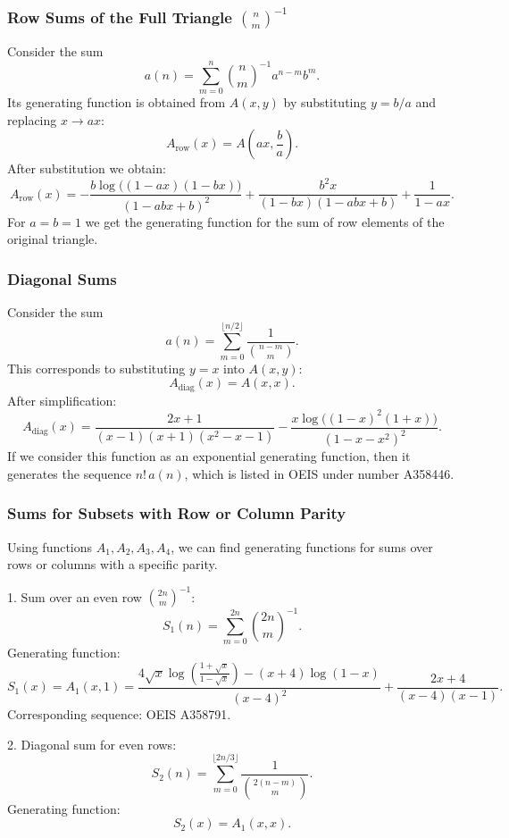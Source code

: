 \documentclass[12pt]{article}
\begin{document}
\subsubsection{Row Sums of the Full Triangle \( \binom{n}{m}^{-1} \)}\label{LS9}

Consider the sum
\[
a(n) = \sum_{m=0}^{n} \binom{n}{m}^{-1} a^{n-m} b^m.
\]
Its generating function is obtained from \( A(x,y) \) by substituting \( y = b/a \) and replacing \( x \to a x \):
\[
A_{\text{row}}(x) = A\!\left(a x, \frac{b}{a}\right).
\]
After substitution we obtain:
\[
A_{\text{row}}(x) =
- \frac{b \log\!\bigl((1-ax)(1-bx)\bigr)}{(1 - a b x + b)^2}
+ \frac{b^2 x}{(1-bx)(1 - a b x + b)}
+ \frac{1}{1 - a x}.
\]
For \( a = b = 1 \) we get the generating function for the sum of row elements of the original triangle.

\subsubsection{Diagonal Sums}

Consider the sum
\[
a(n) = \sum_{m=0}^{\lfloor n/2 \rfloor} \frac{1}{\binom{n-m}{m}}.
\]
This corresponds to substituting \( y = x \) into \( A(x,y) \):
\[
A_{\text{diag}}(x) = A(x, x).
\]
After simplification:
\[
A_{\text{diag}}(x) =
\frac{2x+1}{(x-1)(x+1)(x^2-x-1)}
- \frac{x \log\!\bigl((1-x)^2(1+x)\bigr)}{(1 - x - x^2)^2}.
\]
If we consider this function as an exponential generating function, then it generates the sequence \( n! \, a(n) \), which is listed in OEIS under number A358446.

\subsubsection{Sums for Subsets with Row or Column Parity}

Using functions \( A_1, A_2, A_3, A_4 \), we can find generating functions for sums over rows or columns with a specific parity.

1. Sum over an even row \( \binom{2n}{m}^{-1} \):
   \[
   S_1(n) = \sum_{m=0}^{2n} \binom{2n}{m}^{-1}.
   \]
   Generating function:
   \[
   S_1(x) = A_1(x, 1) =
   \frac{4\sqrt{x} \log\!\left(\frac{1+\sqrt{x}}{1-\sqrt{x}}\right) - (x+4)\log(1-x)}{(x-4)^2}
   + \frac{2x+4}{(x-4)(x-1)}.
   \]
   Corresponding sequence: OEIS A358791.

2. Diagonal sum for even rows:
   \[
   S_2(n) = \sum_{m=0}^{\lfloor 2n/3 \rfloor} \frac{1}{\binom{2(n-m)}{m}}.
   \]
   Generating function: \[S_2(x) = A_1(x, x).\]
\end{document}
